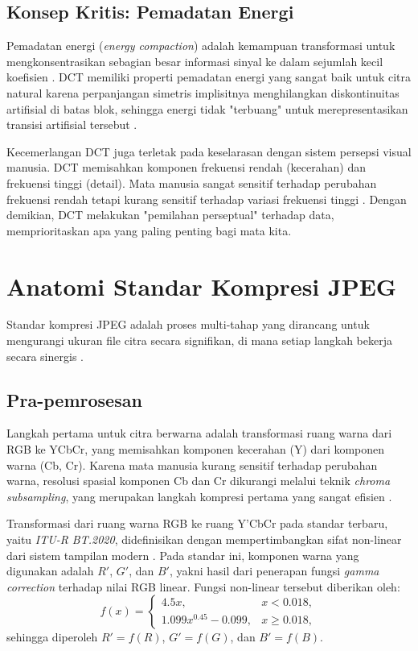 \documentclass[a4paper]{article}
\begin{document}
\subsection{Konsep Kritis: Pemadatan Energi}
Pemadatan energi (\textit{energy compaction}) adalah kemampuan transformasi untuk mengkonsentrasikan sebagian besar informasi sinyal ke dalam sejumlah kecil koefisien \cite{saab_transform_arxiv}. DCT memiliki properti pemadatan energi yang sangat baik untuk citra natural karena perpanjangan simetris implisitnya menghilangkan diskontinuitas artifisial di batas blok, sehingga energi tidak "terbuang" untuk merepresentasikan transisi artifisial tersebut \cite{ucsd_dct_notes, samsung2018heecn}.

Kecemerlangan DCT juga terletak pada keselarasan dengan sistem persepsi visual manusia. DCT memisahkan komponen frekuensi rendah (kecerahan) dan frekuensi tinggi (detail). Mata manusia sangat sensitif terhadap perubahan frekuensi rendah tetapi kurang sensitif terhadap variasi frekuensi tinggi \cite{wallace1991jpeg}. Dengan demikian, DCT melakukan "pemilahan perseptual" terhadap data, memprioritaskan apa yang paling penting bagi mata kita.

\section{Anatomi Standar Kompresi JPEG}
Standar kompresi JPEG adalah proses multi-tahap yang dirancang untuk mengurangi ukuran file citra secara signifikan, di mana setiap langkah bekerja secara sinergis \cite{wallace1991jpeg}.

\subsection{Pra-pemrosesan}
Langkah pertama untuk citra berwarna adalah transformasi ruang warna dari RGB ke YCbCr, yang memisahkan komponen kecerahan (Y) dari komponen warna (Cb, Cr). Karena mata manusia kurang sensitif terhadap perubahan warna, resolusi spasial komponen Cb dan Cr dikurangi melalui teknik \textit{chroma subsampling}, yang merupakan langkah kompresi pertama yang sangat efisien \cite{wallace1991jpeg}.

Transformasi dari ruang warna RGB ke ruang Y'CbCr pada standar terbaru, yaitu \textit{ITU-R BT.2020},
didefinisikan dengan mempertimbangkan sifat non-linear dari sistem tampilan modern \cite{itu2020}.
Pada standar ini, komponen warna yang digunakan adalah $R'$, $G'$, dan $B'$,
yakni hasil dari penerapan fungsi \textit{gamma correction} terhadap nilai RGB linear.
Fungsi non-linear tersebut diberikan oleh:
\begin{equation}
  f(x) =
  \begin{cases}
    4.5x,                  & x < 0.018,   \\[4pt]
    1.099x^{0.45} - 0.099, & x \ge 0.018,
  \end{cases}
\end{equation}
sehingga diperoleh $R' = f(R)$, $G' = f(G)$, dan $B' = f(B)$.
\end{document}
